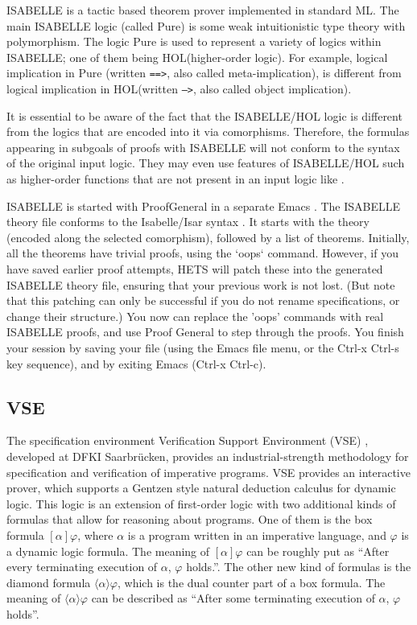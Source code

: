 \documentclass{article}
\newcommand{\normalTEXTSC}[2]{{#1\scriptsize#2}}
\newcommand     {\Hets}{\normalTEXTSC{H}{ETS}\xspace}
\newcommand     {\HOL}{\normalTEXTSC{H}{OL}\xspace}
\newcommand     {\Isabelle}{\normalTEXTSC{I}{SABELLE}\xspace}
\begin{document}
\Isabelle is a tactic based theorem prover implemented in standard ML.
The main \Isabelle logic (called Pure) is some weak intuitionistic type
theory with polymorphism. The logic Pure is used to represent a
variety of logics within \Isabelle; one of them being \HOL (higher-order
logic).  For example, logical implication in Pure (written
\texttt{==>}, also called meta-implication), is different from logical
implication in \HOL (written \texttt{-->}, also called object
implication).

It is essential to be aware of the fact that the \Isabelle/\HOL logic
is different from the logics that are encoded into it via comorphisms.
Therefore, the formulas appearing in subgoals of proofs with \Isabelle
will not conform to the syntax of the original input logic.  They may
even use features of \Isabelle/\HOL such as higher-order functions
that are not present in an input logic like \CASL.

\Isabelle is started with ProofGeneral
\cite{DBLP:conf/tacas/Aspinall00,url:ProofGeneral} in a separate Emacs
\cite{url:Emacs,url:XEmacs}.
The \Isabelle theory file conforms to the Isabelle/Isar syntax
\cite{NipPauWen02}. It starts with the theory (encoded along the selected
 comorphism), followed by a list of theorems. Initially, all the
 theorems have trivial proofs, using the `oops` command. However, if
 you have saved earlier proof attempts, \Hets will patch these into
 the generated \Isabelle theory file, ensuring that your previous work
 is not lost. (But note that this patching can only be successful
 if you do not rename specifications, or change their structure.)  You
 now can replace the 'oops' commands with real \Isabelle proofs, and
 use Proof General to step through the proofs. You finish your session
 by saving your file (using the Emacs file menu, or the Ctrl-x Ctrl-s
 key sequence), and by exiting Emacs (Ctrl-x Ctrl-c).


\subsection{VSE}
\label{subsec:VSE}
 The specification environment Verification Support Environment
(VSE) \cite{VSE00}, developed at
DFKI Saarbr\"ucken, provides an industrial-strength  methodology
for specification and verification of imperative programs.
VSE provides an interactive prover, which supports a Gentzen style
natural deduction calculus for dynamic logic.
This logic is an extension of first-order logic with two additional
kinds of formulas
that allow for reasoning about programs. One of them is the
box formula $[\alpha]\varphi$, where $\alpha$ is a program written in an imperative
language, and $\varphi$ is a dynamic logic formula.
The meaning of $[\alpha]\varphi$ can be roughly put as
``After every terminating execution of $\alpha$, $\varphi$ holds.''.
The other new kind
of formulas is the diamond formula $\langle\alpha\rangle\varphi$, which is the dual counter part
of a box formula. The meaning of $\langle\alpha\rangle\varphi$
can be described as ``After some terminating execution of $\alpha$,
$\varphi$ holds''.
\end{document}
